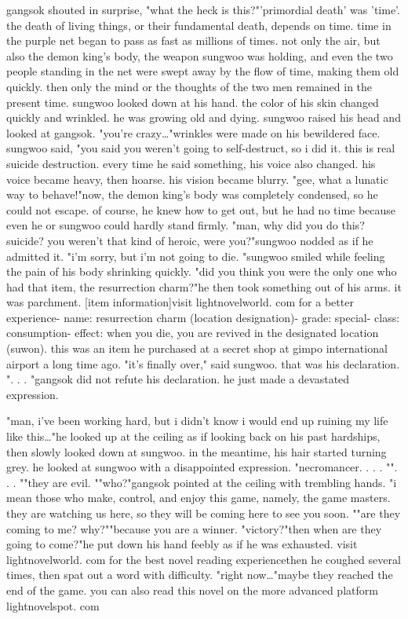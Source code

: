 gangsok shouted in surprise, "what the heck is this?"'primordial death' was 'time'.
 the death of living things, or their fundamental death, depends on time.
 time in the purple net began to pass as fast as millions of times.
not only the air, but also the demon king's body, the weapon sungwoo was holding, and even the two people standing in the net were swept away by the flow of time, making them old quickly.
 then only the mind or the thoughts of the two men remained in the present time.
sungwoo looked down at his hand.
 the color of his skin changed quickly and wrinkled.
 he was growing old and dying.
sungwoo raised his head and looked at gangsok.
 "you're crazy…"wrinkles were made on his bewildered face.
sungwoo said, "you said you weren't going to self-destruct, so i did it.
 this is real suicide destruction.
 every time he said something, his voice also changed.
 his voice became heavy, then hoarse.
 his vision became blurry.
"gee, what a lunatic way to behave!"now, the demon king's body was completely condensed, so he could not escape.
 of course, he knew how to get out, but he had no time because even he or sungwoo could hardly stand firmly.
 "man, why did you do this? suicide? you weren't that kind of heroic, were you?"sungwoo nodded as if he admitted it.
 "i'm sorry, but i'm not going to die.
"sungwoo smiled while feeling the pain of his body shrinking quickly.
 "did you think you were the only one who had that item, the resurrection charm?"he then took something out of his arms.
 it was parchment.
[item information]visit lightnovelworld.
c­om for a better experience- name: resurrection charm (location designation)- grade: special- class: consumption- effect: when you die, you are revived in the designated location (suwon).
this was an item he purchased at a secret shop at gimpo international airport a long time ago.
"it's finally over," said sungwoo.
 that was his declaration.
".
.
.
"gangsok did not refute his declaration.
 he just made a devastated expression.


"man, i've been working hard, but i didn't know i would end up ruining my life like this…"he looked up at the ceiling as if looking back on his past hardships, then slowly looked down at sungwoo.
 in the meantime, his hair started turning grey.
 he looked at sungwoo with a disappointed expression.
"necromancer.
.
.
.
"".
.
.
""they are evil.
""who?"gangsok pointed at the ceiling with trembling hands.
"i mean those who make, control, and enjoy this game, namely, the game masters.
 they are watching us here, so they will be coming here to see you soon.
""are they coming to me? why?""because you are a winner.
"victory?"then when are they going to come?"he put down his hand feebly as if he was exhausted.
visit lightnovelworld.
c­om for the best novel reading experiencethen he coughed several times, then spat out a word with difficulty.
"right now…"maybe they reached the end of the game.
 you can also read this novel on the more advanced platform lightnovelspot.
com

 